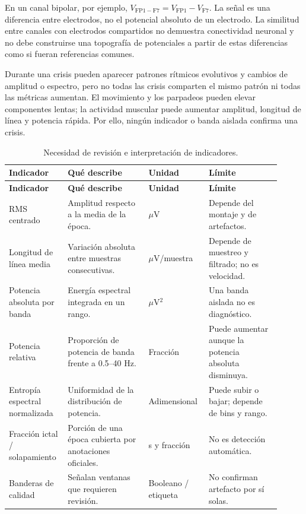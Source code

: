 \documentclass[11pt,a4paper]{article}
\begin{document}
En un canal bipolar, por ejemplo, \(
V_{\mathrm{FP1-F7}}=V_{\mathrm{FP1}}-V_{\mathrm{F7}}
\). La señal es una diferencia entre electrodos, no el potencial absoluto de un electrodo. La similitud entre canales con electrodos compartidos no demuestra conectividad neuronal y no debe construirse una topografía de potenciales a partir de estas diferencias como si fueran referencias comunes.

Durante una crisis pueden aparecer patrones rítmicos evolutivos y cambios de amplitud o espectro, pero no todas las crisis comparten el mismo patrón ni todas las métricas aumentan. El movimiento y los parpadeos pueden elevar componentes lentas; la actividad muscular puede aumentar amplitud, longitud de línea y potencia rápida. Por ello, ningún indicador o banda aislada confirma una crisis.

\begin{longtable}{p{0.20\linewidth}p{0.28\linewidth}p{0.18\linewidth}p{0.25\linewidth}}
\caption{Necesidad de revisión e interpretación de indicadores.}\\
\toprule
\textbf{Indicador} & \textbf{Qué describe} & \textbf{Unidad} & \textbf{Límite}\\
\midrule
\endfirsthead
\toprule \textbf{Indicador} & \textbf{Qué describe} & \textbf{Unidad} & \textbf{Límite}\\ \midrule
\endhead
RMS centrado & Amplitud respecto a la media de la época. & $\mu$V & Depende del montaje y de artefactos.\\
Longitud de línea media & Variación absoluta entre muestras consecutivas. & $\mu$V/muestra & Depende de muestreo y filtrado; no es velocidad.\\
Potencia absoluta por banda & Energía espectral integrada en un rango. & $\mu$V$^2$ & Una banda aislada no es diagnóstico.\\
Potencia relativa & Proporción de potencia de banda frente a 0.5--40 Hz. & Fracción & Puede aumentar aunque la potencia absoluta disminuya.\\
Entropía espectral normalizada & Uniformidad de la distribución de potencia. & Adimensional & Puede subir o bajar; depende de bins y rango.\\
Fracción ictal / solapamiento & Porción de una época cubierta por anotaciones oficiales. & s y fracción & No es detección automática.\\
Banderas de calidad & Señalan ventanas que requieren revisión. & Booleano / etiqueta & No confirman artefacto por sí solas.\\
\bottomrule
\end{longtable}
\end{document}
